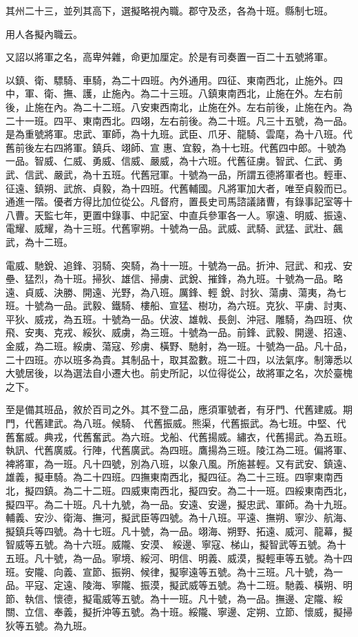 \begin{pinyinscope}
 其州二十三，並列其高下，選擬略視內職。郡守及丞，各為十班。縣制七班。



 用人各擬內職云。



 又詔以將軍之名，高卑舛雜，命更加厘定。於是有司奏置一百二十五號將軍。



 以鎮、衛、驃騎、車騎，為二十四班。內外通用。四征、東南西北，止施外。四中，軍、衛、撫、護，止施內。為二十三班。八鎮東南西北，止施在外。左右前後，止施在內。為二十二班。八安東西南北，止施在外。左右前後，止施在內。為二十一班。四平、東南西北。四翊，左右前後。為二十班。凡三十五號，為一品。是為重號將軍。忠武、軍師，為十九班。武臣、爪牙、龍騎、雲麾，為十八班。代舊前後左右四將軍。鎮兵、翊師、宣
 惠、宜毅，為十七班。代舊四中郎。十號為一品。智威、仁威、勇威、信威、嚴威，為十六班。代舊征虜。智武、仁武、勇武、信武、嚴武，為十五班。代舊冠軍。十號為一品，所謂五德將軍者也。輕車、征遠、鎮朔、武旅、貞毅，為十四班。代舊輔國。凡將軍加大者，唯至貞毅而已。通進一階。優者方得比加位從公。凡督府，置長史司馬諮議諸曹，有錄事記室等十八曹。天監七年，更置中錄事、中記室、中直兵參軍各一人。寧遠、明威、振遠、電耀、威耀，為十三班。代舊寧朔。十號為一品。武威、武騎、武猛、武壯、飆武，為十二班。



 電威、馳銳、追鋒、羽騎、突騎，為十一班。十號為一品。折沖、冠武、和戎、安壘、猛烈，為十班。掃狄、雄信、掃虜、武銳、摧鋒，為九班。十號為一品。略遠、貞威、決勝、開遠、光野，為八班。厲鋒、輕
 銳、討狄、蕩虜、蕩夷，為七班。十號為一品。武毅、鐵騎、樓船、宣猛、樹功，為六班。克狄、平虜、討夷、平狄、威戎，為五班。十號為一品。伏波、雄戟、長劍、沖冠、雕騎，為四班、佽飛、安夷、克戎、綏狄、威虜，為三班。十號為一品。前鋒、武毅、開邊、招遠、金威，為二班。綏虜、蕩寇、殄虜、橫野、馳射，為一班。十號為一品。凡十品，二十四班。亦以班多為貴。其制品十，取其盈數。班二十四，以法氣序。制簿悉以大號居後，以為選法自小遷大也。前史所記，以位得從公，故將軍之名，次於臺槐之下。



 至是備其班品，敘於百司之外。其不登二品，應須軍號者，有牙門、代舊建威。期門，代舊建武。為八班。候騎、
 代舊振威。熊渠，代舊振武。為七班。中堅、代舊奮威。典戎，代舊奮武。為六班。戈船、代舊揚威。繡衣，代舊揚武。為五班。執訊、代舊廣威。行陣，代舊廣武。為四班。鷹揚為三班。陵江為二班。偏將軍、裨將軍，為一班。凡十四號，別為八班，以象八風。所施甚輕。又有武安、鎮遠、雄義，擬車騎。為二十四班。四撫東南西北，擬四征。為二十三班。四寧東南西北，擬四鎮。為二十二班。四威東南西北，擬四安。為二十一班。四綏東南西北，擬四平。為二十班。凡十九號，為一品。安遠、安邊，擬忠武、軍師。為十九班。輔義、安沙、衛海、撫河，擬武臣等四號。為十八班。平遠、撫朔、寧沙、航海、擬鎮兵等四號。為十七班。凡十號，為一品。翊海、朔野、拓遠、威河、龍幕，擬智威等五號。為十六班。威隴、安漠、
 綏邊、寧寇、梯山，擬智武等五號。為十五班。凡十號，為一品。寧境、綏河、明信、明義、威漠，擬輕車等五號。為十四班。安隴、向義、宣節、振朔、候律，擬寧遠等五號。為十三班。凡十號，為一品。平寇、定遠、陵海、寧隴、振漠，擬武威等五號。為十二班。馳義、橫朔、明節、執信、懷德，擬電威等五號。為十一班。凡十號，為一品。撫邊、定隴、綏關、立信、奉義，擬折沖等五號。為十班。綏隴、寧邊、定朔、立節、懷威，擬掃狄等五號。為九班。




\end{pinyinscope}

